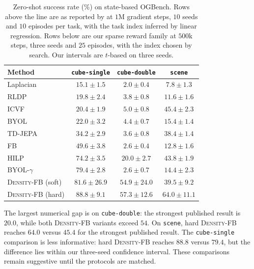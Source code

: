 \documentclass{article}
\newcommand{\DensityFB}{\textsc{Density-FB}}
\begin{document}
\begin{table}[h]
\centering
\small
\begin{tabular}{lccc}
\toprule
Method
& \texttt{cube-single}
& \texttt{cube-double}
& \texttt{scene} \\
\midrule

Laplacian \citep{wu2018laplacian}
& $15.1 \pm 1.5$
& $2.0 \pm 0.4$
& $7.8 \pm 1.3$ \\

RLDP \citep{jajoo-iclr26a}
& $19.8 \pm 2.4$
& $3.8 \pm 0.8$
& $11.6 \pm 1.6$ \\

ICVF \citep{ghosh2023reinforcement}
& $20.4 \pm 1.9$
& $5.0 \pm 0.8$
& $45.4 \pm 2.3$ \\

BYOL
& $22.0 \pm 3.2$
& $4.4 \pm 0.7$
& $15.4 \pm 1.4$ \\

TD-JEPA \citep{bagatella-iclr26a}
& $34.2 \pm 2.9$
& $3.6 \pm 0.8$
& $38.4 \pm 1.4$ \\

FB \citep{touati2021learning}
& $49.6 \pm 3.8$
& $2.6 \pm 0.4$
& $12.8 \pm 1.6$ \\

HILP \citep{park-iclr24a}
& $74.2 \pm 3.5$
& $20.0 \pm 2.7$
& $43.8 \pm 1.9$ \\

BYOL-$\gamma$
& $79.4 \pm 2.8$
& $2.6 \pm 0.7$
& $14.4 \pm 2.3$ \\
\midrule

\DensityFB{} (soft)
& $81.6 \pm 26.9$
& $\mathbf{54.9 \pm 24.0}$
& $39.5 \pm 9.2$ \\

\DensityFB{} (hard)
& $\mathbf{88.8 \pm 9.1}$
& $\mathbf{57.3 \pm 12.6}$
& $\mathbf{64.0 \pm 11.1}$ \\
\bottomrule
\end{tabular}

\caption{
Zero-shot success rate (\%) on state-based OGBench.
Rows above the line are as reported by \citet{bagatella-iclr26a} at $1$M gradient steps, $10$ seeds and $10$ episodes per task, with the task index inferred by linear regression.
Rows below are our sparse reward family at $500$k steps, three seeds and $25$ episodes, with the index chosen by search.
Our intervals are $t$-based on three seeds.
}
\label{tab:published}
\end{table}

The largest numerical gap is on \texttt{cube-double}: the strongest published result is $20.0$, while both \DensityFB{} variants exceed $54$.
On \texttt{scene}, hard \DensityFB{} reaches $64.0$ versus $45.4$ for the strongest published result.
The \texttt{cube-single} comparison is less informative: hard \DensityFB{} reaches $88.8$ versus $79.4$, but the difference lies within our three-seed confidence interval.
These comparisons remain suggestive until the protocols are matched.
\end{document}
